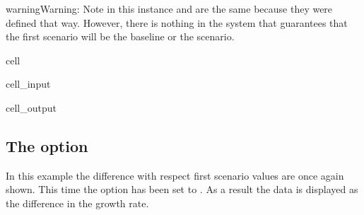 \documentclass[letterpaper,10pt,english]{jupyterBook}
\begin{document}
\begin{sphinxadmonition}{warning}{Warning:}
\sphinxAtStartPar
Note in this instance  and  are the same because they were defined that way.  However, there is nothing in the system that guarantees that the first  scenario will be the baseline or the  scenario.
\end{sphinxadmonition}

\begin{sphinxuseclass}{cell}\begin{sphinxVerbatimInput}

\begin{sphinxuseclass}{cell_input}
\begin{sphinxVerbatim}[commandchars=\\\{\}]
  
\end{sphinxVerbatim}

\end{sphinxuseclass}\end{sphinxVerbatimInput}
\begin{sphinxVerbatimOutput}

\begin{sphinxuseclass}{cell_output}
\noindent{}

\noindent{}

\noindent{}

\end{sphinxuseclass}\end{sphinxVerbatimOutput}

\end{sphinxuseclass}

\subsection{The  option}
\label{\detokenize{content/05_WBModels/ScenarioAnalysis:the-showtype-option}}
\sphinxAtStartPar
In this example the difference with respect first  scenario  values are once again shown. This time the  option has been set to .  As a result the data is displayed as the  difference in the growth rate.
\end{document}
